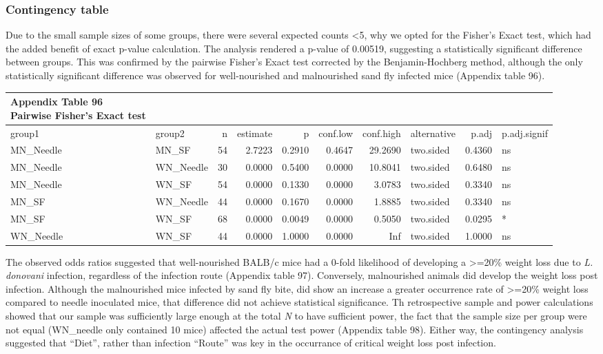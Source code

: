\documentclass[
  12pt,
  letterpaper,
]{article}
\begin{document}
\subsubsection{Contingency table}\label{contingency-table-2}

Due to the small sample sizes of some groups, there were several expected counts \textless5, why we opted for the Fisher's Exact test, which had the added benefit of exact p-value calculation. The analysis rendered a p-value of 0.00519, suggesting a statistically significant difference between groups. This was confirmed by the pairwise Fisher's Exact test corrected by the Benjamin-Hochberg method, although the only statistically significant difference was observed for well-nourished and malnourished sand fly infected mice (Appendix table 96).

\begin{longtable}{llrrrrrlrl}
\caption*{
{\large \textbf{Appendix Table 96}} \\ 
{\small \textbf{Pairwise Fisher's Exact test}}
} \\ 
\toprule
group1 & group2 & n & estimate & p & conf.low & conf.high & alternative & p.adj & p.adj.signif \\ 
\midrule\addlinespace[2.5pt]
MN\_Needle & MN\_SF & 54 & 2.7223 & 0.2910 & 0.4647 & 29.2690 & two.sided & 0.4360 & ns \\ 
MN\_Needle & WN\_Needle & 30 & 0.0000 & 0.5400 & 0.0000 & 10.8041 & two.sided & 0.6480 & ns \\ 
MN\_Needle & WN\_SF & 54 & 0.0000 & 0.1330 & 0.0000 & 3.0783 & two.sided & 0.3340 & ns \\ 
MN\_SF & WN\_Needle & 44 & 0.0000 & 0.1670 & 0.0000 & 1.8885 & two.sided & 0.3340 & ns \\ 
MN\_SF & WN\_SF & 68 & 0.0000 & 0.0049 & 0.0000 & 0.5050 & two.sided & 0.0295 & * \\ 
WN\_Needle & WN\_SF & 44 & 0.0000 & 1.0000 & 0.0000 & Inf & two.sided & 1.0000 & ns \\ 
\bottomrule
\end{longtable}

The observed odds ratios suggested that well-nourished BALB/c mice had a 0-fold likelihood of developing a \textgreater=20\% weight loss due to \emph{L. donovani} infection, regardless of the infection route (Appendix table 97). Conversely, malnourished animals did develop the weight loss post infection. Although the malnourished mice infected by sand fly bite, did show an increase a greater occurrence rate of \textgreater=20\% weight loss compared to needle inoculated mice, that difference did not achieve statistical significance. Th retrospective sample and power calculations showed that our sample was sufficiently large enough at the total \emph{N} to have sufficient power, the fact that the sample size per group were not equal (WN\_needle only contained 10 mice) affected the actual test power (Appendix table 98). Either way, the contingency analysis suggested that ``Diet'', rather than infection ``Route'' was key in the occurrance of critical weight loss post infection.
\end{document}

